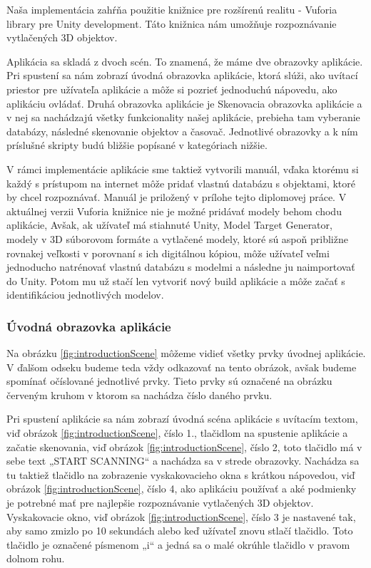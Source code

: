 Naša implementácia zahŕňa použitie knižnice pre rozšírenú realitu - Vuforia library pre Unity development. Táto knižnica nám umožňuje rozpoznávanie vytlačených 3D objektov. 

Aplikácia sa skladá z dvoch scén. To znamená, že máme dve obrazovky aplikácie. Pri spustení sa nám zobrazí úvodná obrazovka aplikácie, ktorá slúži, ako uvítací priestor pre užívateľa aplikácie a môže si pozrieť jednoduchú nápovedu, ako aplikáciu ovládať. Druhá obrazovka aplikácie je Skenovacia obrazovka aplikácie a v nej sa nachádzajú všetky funkcionality našej aplikácie, prebieha tam vyberanie databázy, následné skenovanie objektov a časovač. Jednotlivé obrazovky a k ním príslušné skripty budú bližšie popísané v kategóriach nižšie. 

V rámci implementácie aplikácie sme taktiež vytvorili manuál, vďaka ktorému si každý s prístupom na internet môže pridať vlastnú databázu s objektami, ktoré by chcel rozpoznávať. Manuál je priložený v prílohe tejto diplomovej práce. V aktuálnej verzii Vuforia knižnice nie je možné pridávať modely behom chodu aplikácie, Avšak, ak užívateľ má stiahnuté Unity, Model Target Generator, modely v 3D súborovom formáte a vytlačené modely, ktoré sú aspoň približne rovnakej veľkosti v porovnaní s ich digitálnou kópiou, môže užívateľ veľmi jednoducho natrénovať vlastnú databázu s modelmi a následne ju naimportovať do Unity. Potom mu už stačí len vytvoriť nový build aplikácie a môže začať s identifikáciou jednotlivých modelov. 

\subsubsection{Úvodná obrazovka aplikácie} 


Na obrázku \ref{fig:introductionScene} môžeme vidieť všetky prvky úvodnej aplikácie. V ďalšom odseku budeme teda vždy odkazovať na tento obrázok, avšak budeme spomínať očíslované jednotlivé prvky. Tieto prvky sú označené na obrázku červeným kruhom v ktorom sa nachádza číslo daného prvku. 

Pri spustení aplikácie sa nám zobrazí úvodná scéna aplikácie s uvítacím textom, viď obrázok \ref{fig:introductionScene}, číslo 1., tlačidlom na spustenie aplikácie a začatie skenovania, viď obrázok \ref{fig:introductionScene}, číslo 2, toto tlačidlo má v sebe text „START SCANNING“ a nachádza sa v strede obrazovky. Nachádza sa tu taktiež tlačidlo na zobrazenie vyskakovacieho okna s krátkou nápovedou, viď obrázok \ref{fig:introductionScene}, číslo 4, ako aplikáciu používať a aké podmienky je potrebné mať pre najlepšie rozpoznávanie vytlačených 3D objektov. Vyskakovacie okno, viď obrázok \ref{fig:introductionScene}, číslo 3 je nastavené tak, aby samo zmizlo po 10 sekundách alebo keď užívateľ znovu stlačí tlačidlo. Toto tlačidlo je označené písmenom „i“ a jedná sa o malé okrúhle tlačidlo v pravom dolnom rohu.

